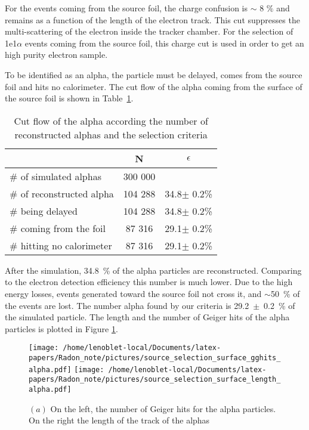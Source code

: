 \documentclass[main.tex]{subfiles}
\begin{document}
\bigskip


\noindent For the events coming from the source foil, the charge confusion is $\sim$ 8 $\%$ and remains as  a function of the length of the electron track. This cut suppresses the multi-scattering of the electron inside the tracker chamber. For the selection of 1e1$\alpha$ events coming from the source foil, this charge cut is used in order to get an high purity electron sample.


\FloatBarrier


\noindent To be identified as an alpha, the particle must be delayed, comes from the source foil and hits no calorimeter. The cut flow of the alpha coming from the surface of the source foil is shown in Table~\ref{Cutflowelectronalpha}.


\begin{table}[h!]
\begin{center}
\begin{tabular}{l|c|c}
 & N & $\epsilon$ \\
\hline
$\#$ of simulated alphas & 300 000 & \\
\hline
$\#$ of reconstructed alpha & 104 288 & 34.8$\pm$ 0.2\%\\
$\#$ being delayed          & 104 288 & 34.8$\pm$ 0.2\%\\
$\#$ coming from the foil   & 87 316  & 29.1$\pm$ 0.2\%\\
$\#$ hitting no calorimeter & 87 316  & 29.1$\pm$ 0.2\%\\
\end{tabular}
\end{center}
\caption{Cut flow of the alpha according the number of reconstructed alphas and the selection criteria}
\label{Cutflowelectronalpha}
\end{table}


\bigskip


\noindent After the simulation, 34.8~\% of the alpha particles are reconstructed. Comparing to the electron detection efficiency this number is much lower. Due to the high energy losses, events generated toward the source foil not cross it, and $\sim$50~\% of the events are lost. The number alpha found by our criteria is 29.2~$\pm$~0.2~\% of the simulated particle. The length and the number of Geiger hits of the alpha particles is plotted in Figure \ref{alphaLengthSSS}.


\bigskip


\begin{figure}[h!]
\begin{center}
\texttt{[image: /home/lenoblet-local/Documents/latex-papers/Radon\_note/pictures/source\_selection\_surface\_gghits\_alpha.pdf]}
\texttt{[image: /home/lenoblet-local/Documents/latex-papers/Radon\_note/pictures/source\_selection\_surface\_length\_alpha.pdf]}


\caption{$(a)$ On the left, the number of Geiger hits for the alpha particles. On the right the length of the track of the alphas}
\label{alphaLengthSSS}
\end{center}
\end{figure}
\end{document}
